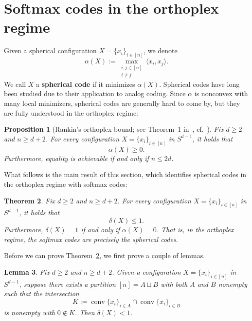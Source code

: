 \documentclass{article}
\theoremstyle{plain}
\newtheorem{theorem}{Theorem}
\newtheorem{lemma}[theorem]{Lemma}
\newtheorem{proposition}[theorem]{Proposition}
\theoremstyle{definition}
\begin{document}
\section{Softmax codes in the orthoplex regime}
\label{sec.softmax orthoplex}

Given a spherical configuration $X = \{x_i\}_{i\in[n]}$, we denote
\[
\alpha(X)
:= \max_{\substack{i,j\in[n]\\i\neq j}}\langle x_i,x_j\rangle.
\]
We call $X$ a \textbf{spherical code} if it minimizes $\alpha(X)$.
Spherical codes have long been studied due to their application to analog coding.
Since $\alpha$ is nonconvex with many local minimizers, spherical codes are generally hard to come by, but they are fully understood in the orthoplex regime:

\begin{proposition}[Rankin's orthoplex bound; see Theorem~1 in~\cite{Rankin:55}, cf.~\cite{ORourke:mo}]
\label{prop.rankin orthoplex bound}
Fix $d\geq2$ and $n\geq d+2$.
For every configuration $X=\{x_i\}_{i\in[n]}$ in $S^{d-1}$, it holds that
\[
\alpha(X)
\geq0.
\]
Furthermore, equality is achievable if and only if $n\leq 2d$.
\end{proposition}

What follows is the main result of this section, which identifies spherical codes in the orthoplex regime with softmax codes:

\begin{theorem}
\label{thm.softmax codes in orthoplex regime}
Fix $d\geq 2$ and $n\geq d+2$.
For every configuration $X=\{x_i\}_{i\in[n]}$ in $S^{d-1}$, it holds that
\[
\delta(X)\leq 1.
\]
Furthermore, $\delta(X)=1$ if and only if $\alpha(X)=0$.
That is, in the orthoplex regime, the softmax codes are precisely the spherical codes.
\end{theorem}

Before we can prove Theorem~\ref{thm.softmax codes in orthoplex regime}, we first prove a couple of lemmas.

\begin{lemma}
\label{lem.K avoids 0}
Fix $d\geq 2$ and $n\geq d+2$.
Given a configuration $X=\{x_i\}_{i\in[n]}$ in $S^{d-1}$, suppose there exists a partition $[n]=A\sqcup B$ with both $A$ and $B$ nonempty such that the intersection
\[
K
:=\operatorname{conv}\{x_i\}_{i\in A} \cap \operatorname{conv}\{x_i\}_{i\in B}
\]
is nonempty with $0\not\in K$.
Then $\delta(X)<1$.
\end{lemma}
\end{document}
